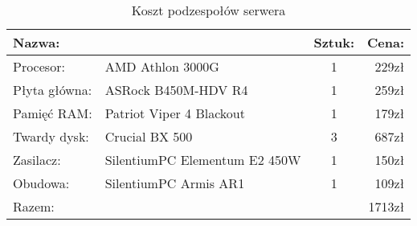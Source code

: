 \documentclass[12pt,a4paper]{article}
\begin{document}
		\begin{table}[!hbp]
			\center
			\begin{tabular}{|l|l|c|r|}
				\hline
				\multicolumn{2}{|l|}{Nazwa:} & Sztuk: & Cena: \\
				\hline
				Procesor: & AMD Athlon 3000G & 1 & 229zł \\
				\hline
				Płyta główna: & ASRock B450M-HDV R4 & 1 & 259zł \\
				\hline
				Pamięć RAM: & Patriot Viper 4 Blackout & 1 & 179zł \\
				\hline
				Twardy dysk: & Crucial BX 500 & 3 & 687zł \\
				\hline
				Zasilacz: & SilentiumPC Elementum E2 450W & 1 & 150zł \\
				\hline
				Obudowa: & SilentiumPC Armis AR1 & 1 & 109zł \\
				\hline
				\multicolumn{3}{|l|}{Razem:} & 1713zł \\
				\hline
			\end{tabular}
			\caption{Koszt podzespołów serwera}
			\label{Koszt podzespołów serwera}
		\end{table}
	
	\newpage
	
\end{document}
